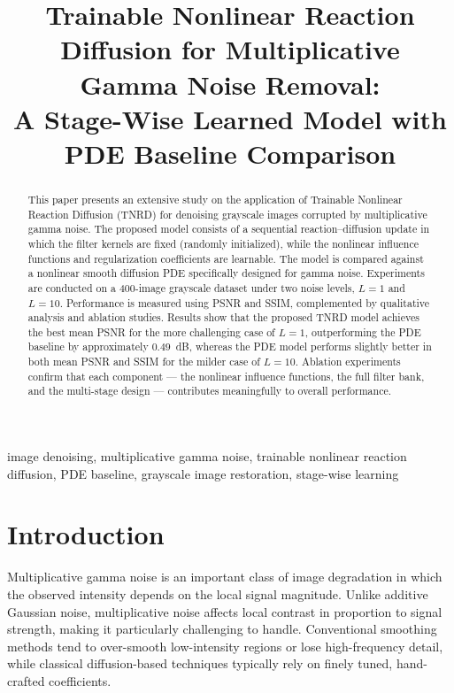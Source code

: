 \documentclass[conference]{IEEEtran}
\title{Trainable Nonlinear Reaction Diffusion for Multiplicative Gamma Noise Removal:\\
A Stage-Wise Learned Model with PDE Baseline Comparison}
\author{%
  \IEEEauthorblockN{Mahipal Jetta}
  \IEEEauthorblockA{Mahindra University}
  \and
  \IEEEauthorblockN{Sujato Dutta}
  \IEEEauthorblockA{Mahindra University}
}
\begin{document}
\maketitle

\begin{abstract}
This paper presents an extensive study on the application of Trainable Nonlinear
Reaction Diffusion (TNRD) for denoising grayscale images corrupted by multiplicative
gamma noise. The proposed model consists of a sequential reaction--diffusion update
in which the filter kernels are fixed (randomly initialized), while the nonlinear
influence functions and regularization coefficients are learnable. The model is
compared against a nonlinear smooth diffusion PDE specifically designed for gamma
noise. Experiments are conducted on a 400-image grayscale dataset under two noise
levels, $L=1$ and $L=10$. Performance is measured using PSNR and SSIM, complemented
by qualitative analysis and ablation studies. Results show that the proposed TNRD
model achieves the best mean PSNR for the more challenging case of $L=1$,
outperforming the PDE baseline by approximately $0.49$~dB, whereas the PDE model
performs slightly better in both mean PSNR and SSIM for the milder case of $L=10$.
Ablation experiments confirm that each component --- the nonlinear influence
functions, the full filter bank, and the multi-stage design --- contributes
meaningfully to overall performance.
\end{abstract}

\begin{IEEEkeywords}
image denoising, multiplicative gamma noise, trainable nonlinear reaction diffusion,
PDE baseline, grayscale image restoration, stage-wise learning
\end{IEEEkeywords}

\section{Introduction}
Multiplicative gamma noise is an important class of image degradation in which
the observed intensity depends on the local signal magnitude. Unlike additive
Gaussian noise, multiplicative noise affects local contrast in proportion to signal
strength, making it particularly challenging to handle. Conventional smoothing
methods tend to over-smooth low-intensity regions or lose high-frequency detail,
while classical diffusion-based techniques typically rely on finely tuned,
hand-crafted coefficients.
\end{document}
